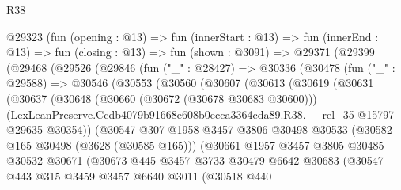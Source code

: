 \begin{lexlean}{R38}
\begin{coremodule}
      @29323
        (fun (opening : @13) =>
        fun (innerStart : @13) =>
        fun (innerEnd : @13) =>
        fun (closing : @13) =>
        fun (shown : @3091) =>
        @29371
          (@29399
            (@29468
              (@29526
                (@29846
                  (fun ("_" : @28427) =>
                  @30336
                    (@30478
                      (fun ("_" : @29588) =>
                      @30546
                        (@30553
                          (@30560
                            (@30607
                              (@30613
                                (@30619
                                  (@30631
                                    (@30637
                                      (@30648
                                        (@30660 (@30672 (@30678 @30683 @30600)))
                                        (LexLeanPreserve.Ccdb4079b91668e608b0ecca3364cda89.R38.__rel_35
                                          @15797
                                          @29635
                                          @30354))
                                      (@30547
                                        @307
                                        @1958
                                        @3457
                                        @3806
                                        @30498
                                        @30533
                                        (@30582 @165 @30498 (@3628 (@30585 @165)))
                                        (@30661
                                          @1957
                                          @3457
                                          @3805
                                          @30485
                                          @30532
                                          @30671
                                          (@30673
                                            @445
                                            @3457
                                            @3733
                                            @30479
                                            @6642
                                            @30683
                                            (@30547
                                              @443
                                              @315
                                              @3459
                                              @3457
                                              @6640
                                              @3011
                                              (@30518
                                                @440

\end{coremodule}
\end{lexlean}
